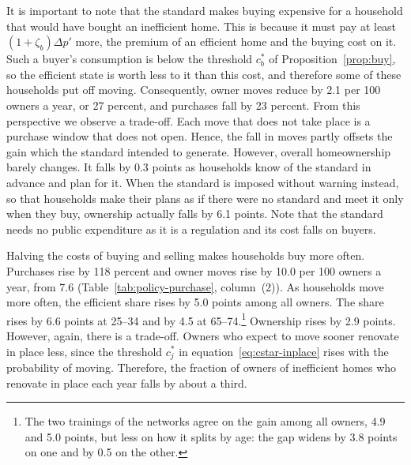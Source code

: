 It is important to note that the standard  makes buying expensive for a household that would have
bought an inefficient home. This is because  it must pay at least $(1+\zeta_b)\Delta p'$
more, the premium of an efficient home and the buying cost on it. Such a
buyer's consumption is below the threshold $c_b^*$ of
Proposition~\ref{prop:buy}, so the efficient state is worth less to it than
this cost, and therefore some of these households put off moving. Consequently, owner moves
reduce by 2.1 per 100 owners a year, or 27 percent, and purchases fall by 23
percent. From this perspective we observe a trade-off. Each move that does not take place is a  purchase window that
does not open. Hence,  the fall in moves partly offsets the gain which the standard intended to generate. However, overall homeownership barely changes. It falls by 0.3 points as households know
of the standard in advance  and plan for it. When the standard is imposed without warning
instead, so that households make their plans as if there were no standard
and meet it only when they buy, ownership actually falls by 6.1 points. Note that the standard
needs no public expenditure as it is a regulation and its cost falls on buyers.



Halving the costs of buying and selling makes households buy more often.
Purchases rise by 118 percent and owner moves rise by
10.0 per 100 owners a year, from 7.6 (Table~\ref{tab:policy-purchase},
column~(2)).  As households move more often, the efficient share rises by 5.0 points among all owners. The share rises by 6.6
points at 25--34 and by 4.5 at 65--74.\footnote{  The two trainings of the networks
agree on the gain among all owners, 4.9 and 5.0 points, but less on how it
splits by age: the gap widens by 3.8 points on one and by 0.5 on the other.}
 Ownership rises by 2.9 points. However, again, there is a trade-off.
Owners who expect to move sooner renovate in place less, since the
threshold $c_j^*$ in equation~\eqref{eq:cstar-inplace} rises with the
probability of moving. Therefore, the fraction of owners of inefficient homes who
renovate in place each year falls by about a third.

